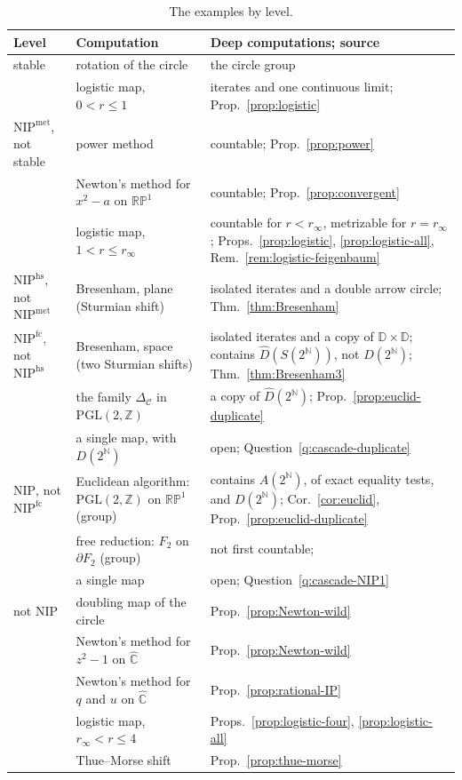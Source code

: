 \documentclass[psamsfonts]{amsart}
\theoremstyle{definition}
\theoremstyle{remark}
\newcommand{\hatC}{\hat{\mathbb{C}}}
\newcommand{\NIP}{\text{NIP}}
\newcommand{\RP}{\mathbb{R}\mathbb{P}}
\numberwithin{equation}{section}
\begin{document}
\begin{table}[ht]
\centering
\small
\renewcommand{\arraystretch}{1.25}
\begin{tabular}{>{\raggedright\arraybackslash}p{2.1cm}>{\raggedright\arraybackslash}p{4.4cm}>{\raggedright\arraybackslash}p{4.6cm}}
\hline
Level & Computation & Deep computations; source\\
\hline
stable & rotation of the circle & the circle group\\
& logistic map, $0<r\le1$ & iterates and one continuous limit; Prop.~\ref{prop:logistic}\\
$\NIP^{\mathrm{met}}$, not stable & power method & countable; Prop.~\ref{prop:power}\\
& Newton's method for $x^2-a$ on $\RP^1$ & countable; Prop.~\ref{prop:convergent}\\
& logistic map, $1<r\le r_\infty$ & countable for $r<r_\infty$, metrizable for $r=r_\infty$; Props.~\ref{prop:logistic}, \ref{prop:logistic-all}, Rem.~\ref{rem:logistic-feigenbaum}\\
$\NIP^{\mathrm{hs}}$, not $\NIP^{\mathrm{met}}$ & Bresenham, plane (Sturmian shift) & isolated iterates and a double arrow circle; Thm.~\ref{thm:Bresenham}\\
$\NIP^{\mathrm{fc}}$, not $\NIP^{\mathrm{hs}}$ & Bresenham, space (two Sturmian shifts) & isolated iterates and a copy of $\mathbb{D}\times\mathbb{D}$; contains $\hat D(S(2^{\mathbb{N}}))$, not $D(2^{\mathbb{N}})$; Thm.~\ref{thm:Bresenham3}\\
& the family $\Delta_{\mathcal{C}}$ in $\mathrm{PGL}(2,\mathbb{Z})$ & a copy of $\hat D(2^{\mathbb{N}})$; Prop.~\ref{prop:euclid-duplicate}\\
& a single map, with $D(2^{\mathbb{N}})$ & open; Question~\ref{q:cascade-duplicate}\\
$\NIP$, not $\NIP^{\mathrm{fc}}$ & Euclidean algorithm: $\mathrm{PGL}(2,\mathbb{Z})$ on $\RP^1$ (group) & contains $A(2^{\mathbb{N}})$, of exact equality tests, and $D(2^{\mathbb{N}})$; Cor.~\ref{cor:euclid}, Prop.~\ref{prop:euclid-duplicate}\\
& free reduction: $F_2$ on $\partial F_2$ (group) & not first countable; \cite{glasner2022tame}\\
& a single map & open; Question~\ref{q:cascade-NIP1}\\
not $\NIP$ & doubling map of the circle & Prop.~\ref{prop:Newton-wild}\\
& Newton's method for $z^2-1$ on $\hatC$ & Prop.~\ref{prop:Newton-wild}\\
& Newton's method for $q$ and $u$ on $\hatC$ & Prop.~\ref{prop:rational-IP}\\
& logistic map, $r_\infty<r\le4$ & Props.~\ref{prop:logistic-four}, \ref{prop:logistic-all}\\
& Thue--Morse shift & Prop.~\ref{prop:thue-morse}\\
\hline
\end{tabular}
\vspace{6pt}
\caption{The examples by level.}
\label{tab:hierarchy}
\end{table}
\end{document}
